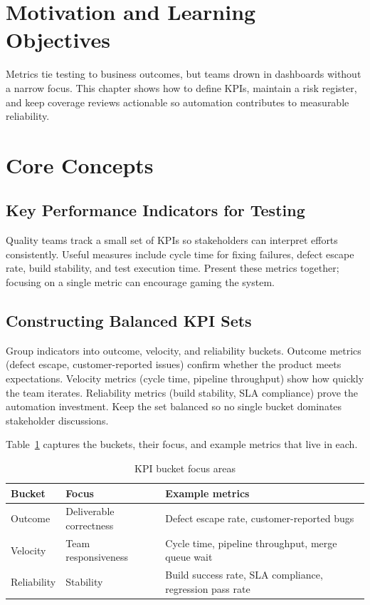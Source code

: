 \section{Motivation and Learning Objectives}

Metrics tie testing to business outcomes, but teams drown in dashboards without a narrow focus. This chapter shows how to define KPIs, maintain a risk register, and keep coverage reviews actionable so automation contributes to measurable reliability.

\section{Core Concepts}

\subsection{Key Performance Indicators for Testing}

Quality teams track a small set of KPIs so stakeholders can interpret efforts consistently. Useful measures include cycle time for fixing failures, defect escape rate, build stability, and test execution time. Present these metrics together; focusing on a single metric can encourage gaming the system.

\subsection{Constructing Balanced KPI Sets}

Group indicators into outcome, velocity, and reliability buckets. Outcome metrics (defect escape, customer-reported issues) confirm whether the product meets expectations. Velocity metrics (cycle time, pipeline throughput) show how quickly the team iterates. Reliability metrics (build stability, SLA compliance) prove the automation investment. Keep the set balanced so no single bucket dominates stakeholder discussions.

Table~\ref{tab:kpi-buckets} captures the buckets, their focus, and example metrics that live in each.

\begin{table}[h]
\centering
\caption{KPI bucket focus areas}
\label{tab:kpi-buckets}
\begin{tabular}{p{3cm}p{5cm}p{4cm}}
\toprule
Bucket & Focus & Example metrics \\
\midrule
Outcome & Deliverable correctness & Defect escape rate, customer-reported bugs \\
Velocity & Team responsiveness & Cycle time, pipeline throughput, merge queue wait \\
Reliability & Stability & Build success rate, SLA compliance, regression pass rate \\
\bottomrule
\end{tabular}
\end{table}

